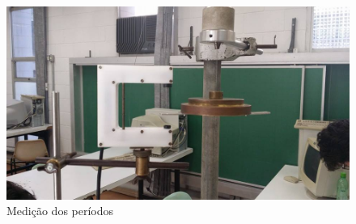 \documentclass[12pt,a4paper]{article}
\begin{document}
\begin{figure}[!htbp]
	\includegraphics[scale=0.50]{03.jpg}
	\caption{Medição dos períodos}
	\label{fig:cilindro}
\end{figure}
\end{document}
